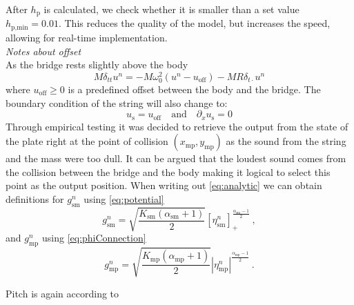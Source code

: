 \documentclass[dvipsnames, pdftex]{article}
\begin{document}
After $h_\text{p}$ is calculated, we check whether it is smaller than a set value $h_{\text{p},\text{min}} = 0.01$. This reduces the quality of the model, but increases the speed, allowing for real-time implementation.
\\
\textit{Notes about offset}
\\
As the bridge rests slightly above the body
\begin{equation}
    M\delta_{tt}u^n=-M\omega_0^2(u^n-u_\text{off})-MR\delta_{t\cdot}u^n
\end{equation}
where $u_\text{off} \geq 0$ is a predefined offset between the body and the bridge. The boundary condition of the string will also change to:
\begin{equation}
    u_\text{s} = u_\text{off}\quad \text{and} \quad \partial_xu_\text{s}=0
\end{equation}
Through empirical testing it was decided to retrieve the output from the state of the plate right at the point of collision $(x_\text{mp},y_\text{mp})$ as the sound from the string and the mass were too dull. It can be argued that the loudest sound comes from the collision between the bridge and the body making it logical to select this point as the output position. 
When writing out \eqref{eq:analytic} we can obtain definitions for $g_\text{sm}^n$ using \eqref{eq:potential}
\begin{equation}\label{eq:gnDef}
    g_\text{sm}^n =\sqrt{\frac{K_\text{sm}(\alpha_\text{sm}+1)}{2}}[\eta_\text{sm}^n]_+^{\frac{\alpha_\text{sm}-1}{2}}\ ,
\end{equation}
and $g_\text{mp}^n$ using \eqref{eq:phiConnection}
\begin{equation}\label{eq:gnDef}
    g_\text{mp}^n =\sqrt{\frac{K_\text{mp}(\alpha_\text{mp} + 1)}{2}} |\eta_\text{mp}^n|^{\frac{\alpha_\text{mp} - 1}{2}}\ .
\end{equation}

Pitch is again according to \cite{Willemsen2018}
\end{document}
